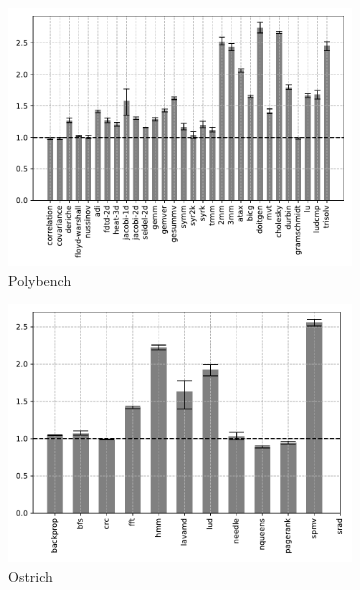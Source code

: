 \begin{figure}
    \centering
    \begin{subfigure}[t]{\textwidth}
        \includegraphics[width=\textwidth]
        {Images/6.1.RQ1/polybench-wasmer-llvm-opt.pdf}
        \caption{Polybench}
    \end{subfigure}
    \begin{subfigure}[t]{.45\textwidth}
        \includegraphics[width=\textwidth]
        {Images/6.1.RQ1/ostrich-wasmer-llvm-opt.pdf}
        \caption{Ostrich}
    \end{subfigure}
    \begin{subfigure}[t]{.45\textwidth}

\end{subfigure}
\end{figure}
